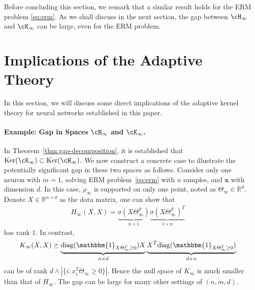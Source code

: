 \documentclass[11pt]{article}
\numberwithin{equation}{section}
\def\bd#1{\mathbf{#1}}
\def\bx{\bd{x}}
\begin{document}
    Before concluding this section, we remark that a similar result holds for the ERM problem \eqref{eq:erm}. As we shall discuss in the next section, the gap between $\cH_\infty$ and $\cK_\infty$ can be large, even for the ERM problem.


    
    








\section{Implications of the Adaptive Theory}
\label{sec:implication-of-theory}

In this section, we will discuss some direct implications of the adaptive kernel theory for neural networks established in this paper.

\paragraph{Example: Gap in Spaces $\cH_\infty$ and $\cK_\infty$.}
In Theorem~\ref{thm:gap-decomposition}, it is established that $\text{Ker}(\cK_\infty) \subset \text{Ker}(\cH_\infty)$. 
We now construct a concrete case to illustrate the potentially significant gap in these two spaces as follows.
Consider only one neuron with $m=1$, solving ERM problem~\eqref{eq:erm} with $n$ samples, and $\bx$ with dimension $d$. In this case, $\rho_\infty$ is supported on only one point, noted as $\Theta_\infty \in \mathbb{R}^d$. Denote $X \in \mathbb{R}^{n\times d}$ as the data matrix, one can show that
\begin{align*}
    H_{\infty}(X, X) = \underbrace{\sigma(X \Theta_\infty^T)}_{n\times 1} \underbrace{\sigma(X \Theta_\infty^T)^T}_{1\times n}
\end{align*}
has rank $1$. In contrast, 
\begin{align*}
    K_{\infty}(X, X) \succeq \underbrace{{\rm diag}(\mathbbm{1}_{X\Theta_\infty^T \geq 0}) X }_{n\times d}   \underbrace{ X^T {\rm diag}( \mathbbm{1}_{X\Theta_\infty^T \geq 0}) }_{d\times n} 
\end{align*}
can be of rank $d \wedge  |\{i: x_i^T \Theta_\infty \geq 0 \}|$. Hence the null space of $K_\infty$ is much smaller than that of $H_\infty$. The gap can be large for many other settings of $(n,m,d)$. 
\end{document}

